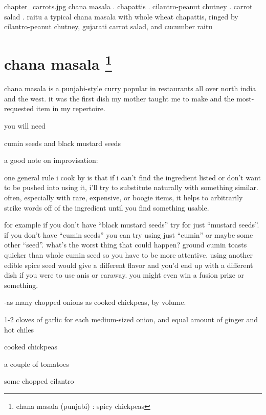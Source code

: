 \mychapter
{chapter_carrots.jpg}
{chana masala . chapattis . cilantro-peanut chutney . carrot salad . raitu}
{a typical chana masala with whole wheat chapattis,
ringed by cilantro-peanut chutney, gujarati carrot salad, and cucumber
raitu}

\section{chana masala
\footnote{chana masala (punjabi) : spicy chickpeas}}

chana masala is a punjabi-style curry popular in restaurants all over north 
india and the west. it was the first dish my mother taught me to make and the 
most-requested item in my repertoire.

you will need

\begin{ingredients}
  \item cumin seeds and black mustard seeds
\end{ingredients}

a good note on improvisation:

one general rule i cook by is that if i can't find the ingredient listed or 
don't want to be pushed into using it, i'll try to substitute naturally with 
something similar. often, especially with rare, expensive, or boogie items, it 
helps to arbitrarily strike words off of the ingredient until you find 
something usable.

for example if you don't have ``black mustard seeds'' try for just ``mustard 
seeds''. if you don't have ``cumin seeds'' you can try using just ``cumin'' or 
maybe some other ``seed''. what's the worst thing that could happen? ground 
cumin toasts quicker than whole cumin seed so you have to be more attentive. 
using another edible spice seed would give a different flavor and you'd end up 
with a different dish if you were to use anis or caraway. you might even win a 
fusion prize or something.

\begin{ingredients}
  \item \onethird -\onehalf as many chopped onions as cooked chickpeas, by volume.
  \item 1-2 cloves of garlic for each medium-sized onion, and equal amount of ginger and hot chiles
  \item cooked chickpeas
  \item a couple of tomatoes
  \item some chopped cilantro
\end{ingredients}

